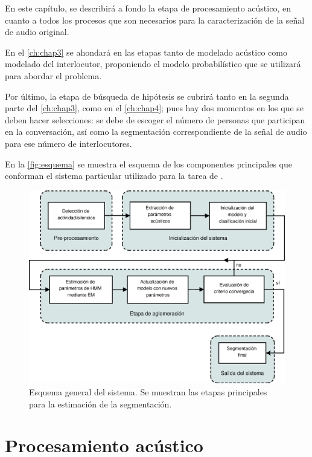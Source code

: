 En este capítulo, se describirá a fondo la etapa de procesamiento acústico, en cuanto a todos los procesos que son necesarios para la caracterización de la señal de audio original.

En el \autoref{ch:chap3} se ahondará en las etapas tanto de modelado acústico como modelado del interlocutor, proponiendo el modelo probabilístico que se utilizará para abordar el problema.

Por último, la etapa de búsqueda de hipótesis se cubrirá tanto en la segunda parte del \autoref{ch:chap3}, como en el \autoref{ch:chap4}; pues hay dos momentos en los que se deben hacer selecciones: se debe de escoger el número de personas que participan en la conversación, así como la segmentación correspondiente de la señal de audio para ese número de interlocutores.

En la \autoref{fig:esquema} se muestra el esquema de los componentes principales que conforman el sistema particular utilizado para la tarea de \sd.

\begin{figure}[ht]
  \centerline
  {\includegraphics[width=1.4\linewidth]{gfx/chap2/ASR_flow}} \quad
  \caption[Esquema general del sistema.]{Esquema general del sistema. Se muestran las etapas principales para la estimación de la segmentación.}
  \label{fig:esquema}
\end{figure}


\section{Procesamiento acústico}

